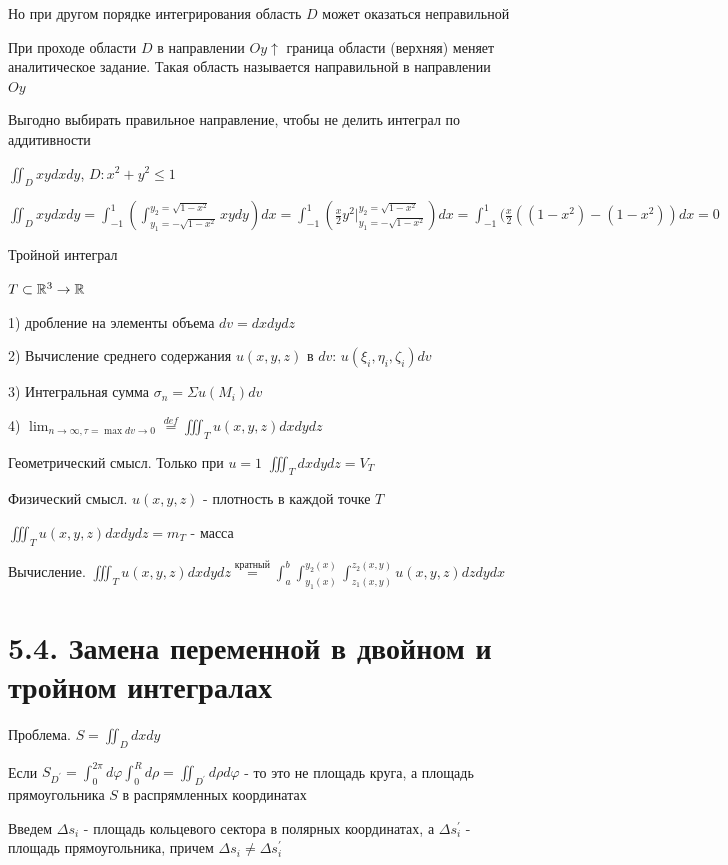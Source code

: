 \documentclass[12pt]{article}
\begin{document}
    Но при другом порядке интегрирования область $D$ может оказаться неправильной

    \Def При проходе области $D$ в направлении $Oy \uparrow$ граница области (верхняя) меняет аналитическое задание. Такая область называется направильной в направлении $Oy$

    Выгодно выбирать правильное направление, чтобы не делить интеграл по аддитивности

    \Ex $\iint_D xy dx dy$, $D : x^2 + y^2 \leq 1$

    $\iint_D xy dx dy = \int_{-1}^1 (\int_{y_1 = -\sqrt{1-x^2}}^{y_2 = \sqrt{1-x^2}} xy dy) dx = \int_{-1}^1 (\frac{x}{2} y^2 \Big|_{y_1 = -\sqrt{1-x^2}}^{y_2 = \sqrt{1-x^2}}) dx =
    \int_{-1}^1 (\frac{x}{2} ((1 - x^2) - (1 - x^2)) dx = 0$

    \Def Тройной интеграл

    $T \subset \mathbb{R}^3 \rightarrow \mathbb{R}$

    1) дробление на элементы объема $dv = dxdydz$

    2) Вычисление среднего содержания $u(x, y, z)$ в $dv$: $u(\xi_i, \eta_i, \zeta_i) dv$

    3) Интегральная сумма $\sigma_n = \Sigma u(M_i) dv$

    4) $\lim_{n \to \infty, \tau = \max dv \to 0} \stackrel{def}{=} \iiint_T u(x, y, z) dxdydz$

    Геометрический смысл. Только при $u = 1$ $\iiint_T dxdydz = V_T$

    Физический смысл. $u(x, y, z)$ - плотность в каждой точке $T$

    $\iiint_T u(x, y, z) dxdydz = m_T$ - масса

    Вычисление. $\iiint_T u(x, y, z) dxdydz \stackrel{\text{кратный}}{=} \int^b_a \int_{y_1(x)}^{y_2(x)} \int_{z_1(x, y)}^{z_2(x, y)} u(x, y, z) dz dy dx$



    \section{5.4. Замена переменной в двойном и тройном интегралах}

    Проблема. $S = \iint_D dxdy$

    Если $S_{D^\prime} = \int_0^{2\pi} d\varphi \int_0^R d\rho = \iint_{D^\prime} d\rho d\varphi$ - то это не площадь круга, а площадь прямоугольника $S$ в распрямленных координатах

    Введем $\Delta s_i$ - площадь кольцевого сектора в полярных координатах, а $\Delta s^\prime_i$ - площадь прямоугольника, причем $\Delta s_i \neq \Delta s_i^\prime$
\end{document}

